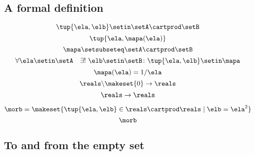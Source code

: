 \begin{forslides}
    \subsection{A formal definition}

    \begin{equation}
        \label{eq:slides_session2_107}
        \tup{\ela, \elb} \setin\setA \cartprod \setB
    \end{equation}
    \begin{equation}
        \label{eq:slides_session2_108}
        \tup{\ela, \mapa(\ela)}
    \end{equation}
    \begin{equation}
        \label{eq:slides_session2_109}
        \mapa \setsubseteq \setA \cartprod \setB
    \end{equation}
    \begin{equation}
        \label{eq:slides_session2_110}
        \forall \ela \setin\setA  \quad  \exists !
        \ \elb \setin\setB \colon \tup{\ela,\elb} \setin\mapa
    \end{equation}
    \begin{equation}
        \label{eq:slides_session2_111}
        \mapa(\ela) = 1/ \ela
    \end{equation}
    \begin{equation}
        \label{eq:slides_session2_112}
        \reals \backslash \makeset{ 0 } \to \reals
    \end{equation}
    \begin{equation}
        \label{eq:slides_session2_113}
        \reals \to \reals
    \end{equation}

    \begin{equation}
        \label{eq:slides_session2_113a}
        \morb = \makeset{\tup{\ela, \elb} \in \reals \cartprod \reals \mid \elb = \ela^2}
    \end{equation}
    \begin{equation}
        \label{eq:slides_session2_113b}
        \morb
    \end{equation}

    \subsection{To and from the empty set}


\end{forslides}
